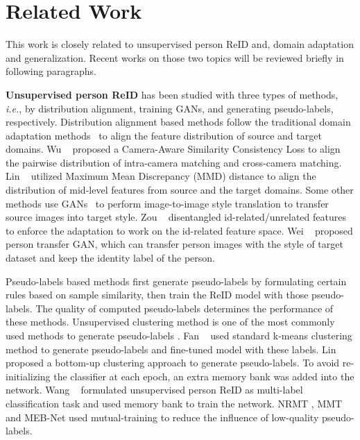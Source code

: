 \documentclass[final]{cvpr}
\begin{document}
\section{Related Work}



This work is closely related to unsupervised person ReID and, domain adaptation and generalization. Recent works on those two topics will be reviewed briefly in following paragraphs.

 
\textbf{Unsupervised person ReID} has been studied with three types of methods, \emph{i.e.}, by distribution alignment, training GANs, and generating pseudo-labels, respectively. Distribution alignment based methods follow the traditional domain adaptation methods~\cite{MMD, coral} to align the feature distribution of source and target domains. Wu \etal~\cite{wu2019unsupervised} proposed a Camera-Aware Similarity Consistency Loss to align the pairwise distribution of intra-camera matching and cross-camera matching.
Lin \etal~\cite{lin2018multi} utilized Maximum Mean Discrepancy (MMD) distance \cite{MMD} to align the distribution of mid-level features from source and the target domains. Some other methods use GANs~\cite{CycleGAN2017} to perform image-to-image style translation to transfer source images into target style.
Zou \etal~\cite{zou2020joint} disentangled id-related/unrelated features to enforce the adaptation to work on the id-related feature space.
Wei \etal~\cite{PTGan} proposed person transfer GAN, which can transfer person images with the style of target dataset and keep the identity label of the person.

Pseudo-labels based methods first generate pseudo-labels by formulating certain rules based on sample similarity, then train the ReID model with those pseudo-labels.
The quality of computed pseudo-labels determines the performance of these methods. Unsupervised clustering method is one of the most commonly used methods to generate pseudo-labels \cite{jin2020global, zhang2019self, multi-label, zhai2020ad, liu2020domain}.
Fan \etal~\cite{fan2018unsupervised} used standard k-means clustering method to generate pseudo-labels and fine-tuned model with these labels.
Lin \etal~\cite{lin2019bottom} proposed a bottom-up clustering approach to generate pseudo-labels. To avoid re-initializing the classifier at each epoch, an extra memory bank was added into the network.
Wang \etal~\cite{multi-label} formulated unsupervised person ReID as multi-label classification task and used memory bank to train the network.
NRMT \cite{zhao2020unsupervised}, MMT \cite{MMT} and MEB-Net \cite{zhai2020multiple} used mutual-training \cite{mutual} to reduce the influence of low-quality pseudo-labels.
\end{document}
